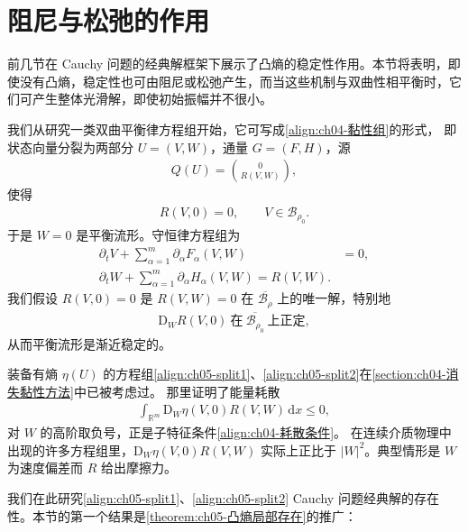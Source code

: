 \documentclass[../../main.tex]{subfiles}
\begin{document}
\section{阻尼与松弛的作用}\label{section:ch05-阻尼与松弛的作用}

前几节在 Cauchy 问题的经典解框架下展示了凸熵的稳定性作用。本节将表明，即使没有凸熵，稳定性也可由阻尼或松弛产生，而当这些机制与双曲性相平衡时，它们可产生整体光滑解，即使初始振幅并不很小。

我们从研究一类双曲平衡律方程组开始，它可写成\eqref{align:ch04-黏性组}的形式，
即状态向量分裂为两部分 $U=(V,W)$，通量 $G=(F,H)$，源
\begin{align}
Q(U)=\binom{0}{R(V,W)},\label{align:ch05-Q-split}
\end{align}
使得
\begin{align}
R(V,0)=0,\qquad V\in\mathscr{B}_{\rho_{0}}.\label{align:ch05-R-equilibrium}
\end{align}
于是 $W=0$ 是平衡流形。守恒律方程组为
\begin{align}
\partial_{t}V+\sum_{\alpha=1}^{m}\partial_{\alpha}F_{\alpha}(V,W)&=0,\label{align:ch05-split1}\\
\partial_{t}W+\sum_{\alpha=1}^{m}\partial_{\alpha}H_{\alpha}(V,W)=R(V,W).\label{align:ch05-split2}
\end{align}
我们假设 $R(V,0)=0$ 是 $R(V,W)=0$ 在 $\overline{\mathscr{B}_{\rho}}$ 上的唯一解，特别地
\begin{align}
\mathrm{D}_{W}R(V,0)\ \text{在}\ \overline{\mathscr{B}_{\rho_{0}}}\ \text{上正定},\label{align:ch05-DWR-positive}
\end{align}
从而平衡流形是渐近稳定的。

装备有熵 $\eta(U)$ 的方程组\eqref{align:ch05-split1}、\eqref{align:ch05-split2}在\cref{section:ch04-消失黏性方法}中已被考虑过。
那里证明了能量耗散
\begin{align}
\int_{\mathbb{R}^{m}}\mathrm{D}_{W}\eta(V,0)R(V,W)\,\mathrm{d}x\leqslant 0,\label{align:ch05-dissipation}
\end{align}
对 $W$ 的高阶取负号，正是子特征条件\eqref{align:ch04-耗散条件}。
在连续介质物理中出现的许多方程组里，$\mathrm{D}_{W}\eta(V,0)R(V,W)$ 实际上正比于 $|W|^{2}$。典型情形是 $W$ 为速度偏差而 $R$ 给出摩擦力。

我们在此研究\eqref{align:ch05-split1}、\eqref{align:ch05-split2} Cauchy 问题经典解的存在性。本节的第一个结果是\cref{theorem:ch05-凸熵局部存在}的推广：
\end{document}
